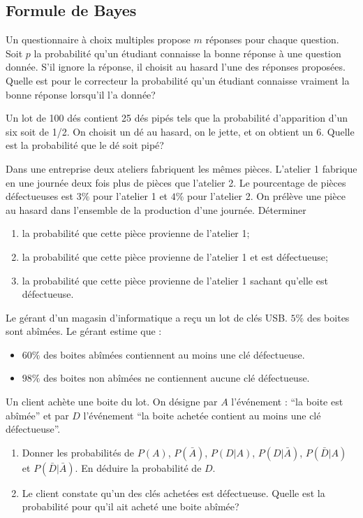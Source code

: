 \documentclass{book}
\begin{document}
\subsection*{Formule de Bayes}
\begin{Exercice}[QCM]
Un questionnaire à choix multiples propose $m$ réponses pour chaque question. Soit $p$ la probabilité qu'un étudiant connaisse la bonne réponse à une question donnée. S'il ignore la réponse, il choisit au hasard l'une des réponses proposées. Quelle est pour le correcteur la probabilité qu'un étudiant connaisse vraiment la bonne réponse lorsqu'il l'a donnée?
\end{Exercice}
\begin{Exercice}[Dé pipé]
Un lot de 100 dés contient 25 dés pipés tels que la probabilité d'apparition d'un six soit de 1/2. On choisit un dé au hasard, on le jette, et on obtient un 6. Quelle est la probabilité que le dé soit pipé?
\end{Exercice}
\begin{Exercice}
Dans une entreprise deux ateliers fabriquent les mêmes pièces. L'atelier 1 fabrique en une journée deux fois plus de pièces que l'atelier 2.
Le pourcentage de pièces défectueuses est $3\%$ pour l'atelier 1 et $4\%$ pour l'atelier 2. On prélève une pièce au hasard dans l'ensemble de la production d'une journée.
Déterminer 
\begin{enumerate}
 \item la probabilité que cette pièce provienne de l'atelier 1;
 \item la probabilité que cette pièce provienne de l'atelier 1 et est défectueuse;
 \item la probabilité que cette pièce provienne de l'atelier 1 sachant qu'elle est défectueuse.
\end{enumerate}
\end{Exercice}
\begin{Exercice}
Le gérant d'un magasin d'informatique a reçu un lot de clés USB. $5\%$ des boites sont abîmées. Le gérant estime que :
\begin{itemize}
\item $60\%$ des boites abîmées contiennent au moins une clé défectueuse.
\item $98\%$ des boites non abîmées ne contiennent aucune clé défectueuse.
\end{itemize}
Un client achète une boite du lot. On désigne par $A$ l'événement : ``la boite est abîmée'' et par $D$ l'événement ``la boite achetée contient au moins une clé défectueuse''. 
\begin{enumerate}
\item Donner les probabilités de $P(A)$, $P(\bar A)$, $P(D|A)$, $P(D|\bar A)$, $P(\bar D|A)$ et $P(\bar D|\bar A)$. En déduire la probabilité de $D$.
\item Le client constate qu'un des clés achetées est défectueuse. Quelle est
la probabilité pour qu'il ait acheté une boite abîmée?
\end{enumerate}
\end{Exercice}
\end{document}
